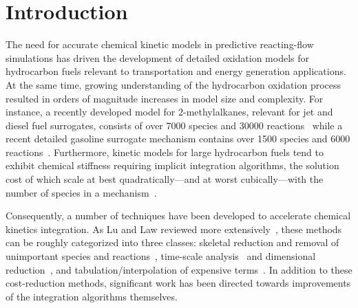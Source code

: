 \documentclass[preprint]{elsarticle}
\begin{document}
\section{Introduction}
\label{sec:Intro}

The need for accurate chemical kinetic models in predictive reacting-flow simulations has driven the development of detailed oxidation models for hydrocarbon fuels relevant to transportation and energy generation applications.
At the same time, growing understanding of the hydrocarbon oxidation process resulted in orders of magnitude increases in model size and complexity.
For instance, a recently developed model for 2-methylalkanes, relevant for jet and diesel fuel surrogates, consists of over 7000 species and 30000 reactions~\cite{Sarathy:2011kx} while a recent detailed gasoline surrogate mechanism contains over 1500 species and 6000 reactions~\cite{Mehl:2011jn}.
Furthermore, kinetic models for large hydrocarbon fuels tend to exhibit chemical stiffness requiring implicit integration algorithms, the solution cost of which scale at best quadratically---and at worst cubically---with the number of species in a mechanism~\cite{Lu:2009gh}.

Consequently, a number of techniques have been developed to accelerate chemical kinetics integration.
As Lu and Law reviewed more extensively~\cite{Lu:2009gh}, these methods can be roughly categorized into three classes: skeletal reduction and removal of unimportant species and reactions~\cite{Lu:2005,Pepiot-Desjardins:2008,Niemeyer:2010bt,Niemeyer:2014,Curtis:2015aa}, time-scale analysis~\cite{qssa,pe_approx1,pe_approx2} and dimensional reduction~\cite{Lam:1988wc,Maas:1992aa,Lu:2001ve}, and tabulation\slash interpolation of expensive terms~\cite{Pope:1997wu,Christo1996}.
In addition to these cost-reduction methods, significant work has been directed towards improvements of the integration algorithms themselves.
\end{document}
